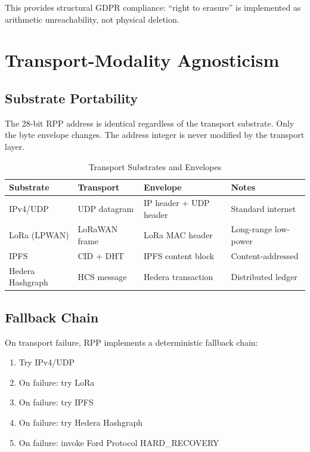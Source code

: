 \documentclass[11pt,a4paper]{article}
\begin{document}
This provides structural GDPR compliance: ``right to erasure'' is implemented as arithmetic unreachability, not physical deletion.

\section{Transport-Modality Agnosticism}

\subsection{Substrate Portability}

The 28-bit RPP address is identical regardless of the transport substrate. Only the byte envelope changes. The address integer is never modified by the transport layer.

\begin{table}[h]
\centering
\begin{tabular}{llll}
\toprule
\textbf{Substrate} & \textbf{Transport} & \textbf{Envelope} & \textbf{Notes} \\
\midrule
IPv4/UDP & UDP datagram & IP header + UDP header & Standard internet \\
LoRa (LPWAN) & LoRaWAN frame & LoRa MAC header & Long-range low-power \\
IPFS & CID + DHT & IPFS content block & Content-addressed \\
Hedera Hashgraph & HCS message & Hedera transaction & Distributed ledger \\
\bottomrule
\end{tabular}
\caption{Transport Substrates and Envelopes}
\label{tab:substrates}
\end{table}

\subsection{Fallback Chain}

On transport failure, RPP implements a deterministic fallback chain:

\begin{enumerate}
    \item Try IPv4/UDP
    \item On failure: try LoRa
    \item On failure: try IPFS
    \item On failure: try Hedera Hashgraph
    \item On failure: invoke Ford Protocol HARD\_RECOVERY
\end{enumerate}
\end{document}
